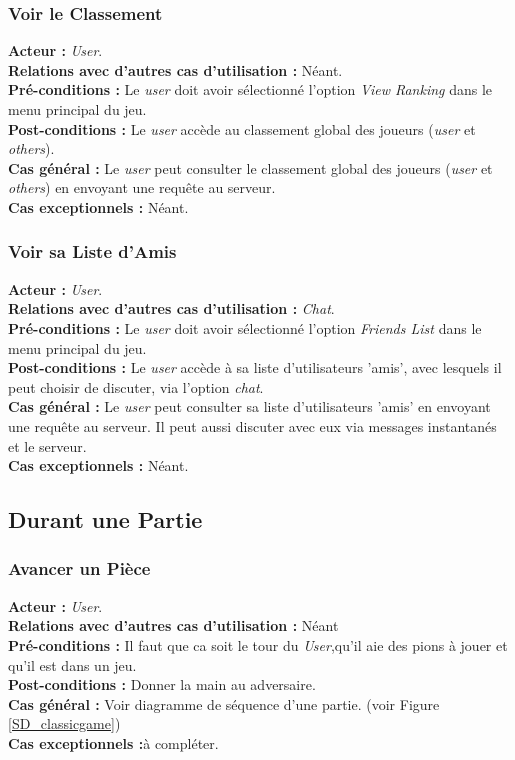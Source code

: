 \documentclass[10pt, a4paper]{article}
\begin{document}
\subsubsection{Voir le Classement}
\textbf{Acteur :} \textit{User}.\\
\textbf{Relations avec d'autres cas d'utilisation :} Néant.\\
\textbf{Pré-conditions :} Le \textit{user} doit avoir sélectionné l'option \textit{View Ranking} dans le menu principal du jeu.\\
\textbf{Post-conditions :} Le \textit{user} accède au classement global des joueurs (\textit{user} et \textit{others}).\\
\textbf{Cas général :} Le \textit{user} peut consulter le classement global des joueurs (\textit{user} et \textit{others}) en envoyant une requête au serveur.\\
\textbf{Cas exceptionnels :} Néant.

\subsubsection{Voir sa Liste d'Amis}
\textbf{Acteur :} \textit{User}.\\
\textbf{Relations avec d'autres cas d'utilisation :} \textit{Chat}.\\
\textbf{Pré-conditions :} Le \textit{user} doit avoir sélectionné l'option \textit{Friends List} dans le menu principal du jeu.\\
\textbf{Post-conditions :} Le \textit{user} accède à sa liste d'utilisateurs 'amis', avec lesquels il peut choisir de discuter, via l'option \textit{chat}.\\
\textbf{Cas général :} Le \textit{user} peut consulter sa liste d'utilisateurs 'amis' en envoyant une requête au serveur. Il peut aussi discuter avec eux via messages instantanés et le serveur.\\
\textbf{Cas exceptionnels :} Néant.
		

\subsection{Durant une Partie}

\subsubsection{Avancer un Pièce}
\textbf{Acteur :} \textit{User}.\\
\textbf{Relations avec d'autres cas d'utilisation :} Néant\\
\textbf{Pré-conditions :} Il faut que ca soit le tour du \textit{User},qu'il aie des pions à jouer et qu'il est dans un jeu. \\
\textbf{Post-conditions :} Donner la main au adversaire.\\
\textbf{Cas général :} Voir diagramme de séquence d'une partie. (voir Figure \ref{SD_classicgame}) \\
\textbf{Cas exceptionnels :}à compléter.
\end{document}
